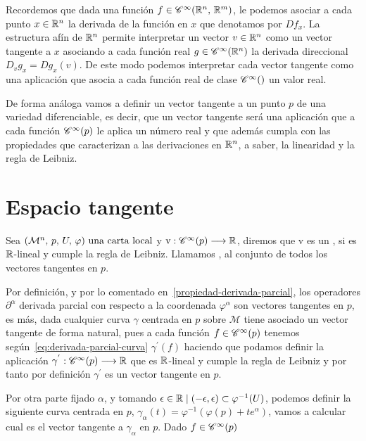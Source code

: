 Recordemos que dada una función $f\in\mathscr{C}^\infty(\mathbb{R}^n,\thinspace\mathbb{R}^m)$, le podemos asociar a cada punto $x\in\mathbb{R}^n$ la
derivada de la función en $x$ que denotamos por $Df_x$.
La estructura afín de $\mathbb{R}^n$ permite interpretar un vector $v\in\mathbb{R}^n$ como un vector tangente a $x$ asociando a cada
función real $g\in\mathscr{C}^\infty(\mathbb{R}^n)$ la derivada direccional $D_{v}g_x=Dg_x(v)$.
De este modo podemos interpretar cada vector tangente como una aplicación que asocia a cada función real de clase
$\cinfinity$ un valor real.

De forma análoga vamos a definir un vector tangente a un punto $p$ de una variedad diferenciable, es decir, que un
vector tangente será una aplicación que a cada función $\mathscr{C}^\infty(p)$ le aplica un número real y que además cumpla
con las propiedades que caracterizan a las derivaciones en $\mathbb{R}^n$, a saber, la linearidad y la regla de Leibniz.

\section{Espacio tangente}\label{sec:espacio-tangente}

\begin{definition}
  Sea $(\mathcal{M}^n,\thinspace p,\thinspace U,\thinspace \varphi)\textmd{ una carta local}$ y $\mathrm{v}:\mathscr{C}^\infty(p)\longrightarrow \mathbb{R}$, diremos que $\mathrm{v}$ es un , si es $\mathbb{R}$-lineal y cumple la regla de Leibniz.
  Llamamos 
  , al conjunto de todos los vectores tangentes en $p$.
\end{definition}

Por definición, y por lo comentado en~\ref{propiedad-derivada-parcial}, los operadores $\partial^\alpha$ derivada
parcial con respecto a la coordenada $\varphi^\alpha$ son vectores tangentes en $p$, es más, dada cualquier curva
$\gamma$ centrada en $p$ sobre $\mathcal{M}$ tiene asociado un vector tangente de forma natural, pues a cada función
$f\in\mathscr{C}^\infty(p)$ tenemos según~\ref{eq:derivada-parcial-curva} $\gamma^{'}(f)$ haciendo que podamos definir la
aplicación $\gamma^{'}:\mathscr{C}^\infty(p)\longrightarrow \mathbb{R}$ que es $\mathbb{R}$-lineal y cumple la regla de Leibniz y por tanto por
definición $\gamma^{'}$ es un vector tangente en $p$.

Por otra parte fijado $\alpha$, y tomando $\epsilon\in\mathbb{R}\mid (-\epsilon, \epsilon)\subset\varphi^{-1}(U)$, podemos
definir la siguiente curva centrada en $p$, $\gamma_\alpha(t)=\varphi^{-1}(\varphi(p)+te^\alpha)$, vamos a calcular cual
es el vector tangente a $\gamma_\alpha$ en $p$.
Dado $f\in\mathscr{C}^\infty(p)$

